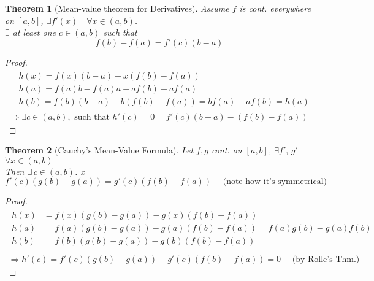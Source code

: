 \documentclass[twoside]{amsart}
\theoremstyle{plain}
\newtheorem{theorem}{Theorem}
\theoremstyle{definition}
\begin{document}
\begin{theorem}[Mean-value theorem for Derivatives]
  Assume $f$ is cont. everywhere on $[a,b]$, $\exists f'(x) \quad \forall x \in (a,b)$.  \\
  $\exists$ at least one $c \in (a,b)$ such that 
\begin{equation}
  f(b) - f(a) = f'(c) (b-a)
\end{equation}
\end{theorem}

\begin{proof}
  \[
  \begin{gathered}
\begin{aligned}
  &  h(x) = f(x)(b-a) - x(f(b) - f(a)) \\
  &  h(a) = f(a)b - f(a)a - af(b) + af(a) \\
  &  h(b) = f(b)(b-a) - b(f(b) - f(a)) = bf(a) - af(b) = h(a) 
\end{aligned} \\
    \Longrightarrow \exists c \in (a,b), \text{ such that } h'(c) = 0 = f'(c)(b-a) - (f(b) - f(a)) 
  \end{gathered}
  \]
\end{proof}

\begin{theorem}[Cauchy's Mean-Value Formula]
  Let $f,g$ cont. on $[a,b]$, $\exists f', \, g' $\quad \, $\forall x \in (a,b)$  \\
Then $\exists \, c \in (a,b)$.  x
\begin{equation}
  f'(c) (g(b) - g(a)) = g'(c) (f(b) - f(a)) \quad \text{ (note how it's symmetrical) }
\end{equation}
\end{theorem}

\begin{proof}
\[
\begin{gathered}
\begin{aligned}
  h(x) & = f(x)(g(b) - g(a)) - g(x)(f(b)-f(a)) \\
  h(a) & = f(a)(g(b) -g(a)) - g(a)(f(b) - f(a)) = f(a)g(b) - g(a)f(b) \\
  h(b) & = f(b)(g(b)-g(a)) - g(b)(f(b)-f(a)) \\
\end{aligned} \\
\Longrightarrow h'(c) = f'(c) (g(b) - g(a)) - g'(c) (f(b) - f(a)) = 0 \quad \text{ (by Rolle's Thm.) }
\end{gathered}
\]
\end{proof}
\end{document}
